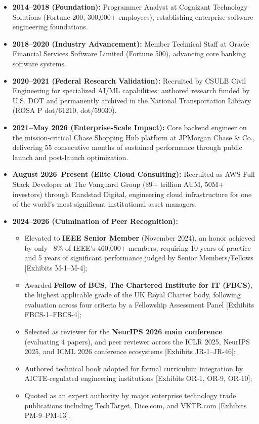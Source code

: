 \begin{itemize}
    \item \textbf{2014--2018 (Foundation):} Programmer Analyst at Cognizant Technology Solutions (Fortune 200, 300,000+ employees), establishing enterprise software engineering foundations.
    
    \item \textbf{2018--2020 (Industry Advancement):} Member Technical Staff at Oracle Financial Services Software Limited (Fortune 500), advancing core banking software systems.
    
    \item \textbf{2020--2021 (Federal Research Validation):} Recruited by CSULB Civil Engineering for specialized AI/ML capabilities; authored research funded by U.S. DOT and permanently archived in the National Transportation Library (ROSA P dot/61210, dot/59030).
    
    \item \textbf{2021--May 2026 (Enterprise-Scale Impact):} Core backend engineer on the mission-critical Chase Shopping Hub platform at JPMorgan Chase \& Co., delivering 55 consecutive months of sustained performance through public launch and post-launch optimization.
    
    \item \textbf{August 2026--Present (Elite Cloud Consulting):} Recruited as AWS Full Stack Developer at The Vanguard Group (\$9+ trillion AUM, 50M+ investors) through Randstad Digital, engineering cloud infrastructure for one of the world's most significant institutional asset managers.
    
    \item \textbf{2024--2026 (Culmination of Peer Recognition):}
    \begin{itemize}
        \item Elevated to \textbf{IEEE Senior Member} (November 2024), an honor achieved by only ~8\% of IEEE's 460,000+ members, requiring 10 years of practice and 5 years of significant performance judged by Senior Members/Fellows [Exhibits M-1--M-4];
        \item Awarded \textbf{Fellow of BCS, The Chartered Institute for IT (FBCS)}, the highest applicable grade of the UK Royal Charter body, following evaluation across four criteria by a Fellowship Assessment Panel [Exhibits FBCS-1--FBCS-4];
        \item Selected as reviewer for the \textbf{NeurIPS 2026 main conference} (evaluating 4 papers), and peer reviewer across the ICLR 2025, NeurIPS 2025, and ICML 2026 conference ecosystems [Exhibits JR-1--JR-46];
        \item Authored technical book adopted for formal curriculum integration by AICTE-regulated engineering institutions [Exhibits OR-1, OR-9, OR-10];
        \item Quoted as an expert authority by major enterprise technology trade publications including TechTarget, Dice.com, and VKTR.com [Exhibits PM-9--PM-13].
    \end{itemize}
\end{itemize}

